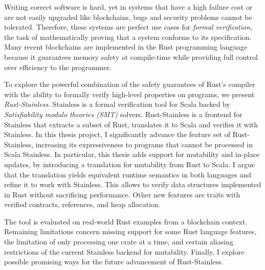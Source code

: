 Writing correct software is hard, yet in systems that have a high failure cost
or are not easily upgraded like blockchains, bugs and security problems cannot
be tolerated. Therefore, these systems are perfect use cases for \emph{formal
verification}, the task of mathematically proving that a system conforms to its
specification. Many recent blockchains are implemented in the Rust programming
language because it guarantees memory safety at compile-time while providing
full control over efficiency to the programmer.

To explore the powerful combination of the safety guarantees of Rust's compiler
with the ability to formally verify high-level properties on programs, we
present \emph{Rust-Stainless}. Stainless is a formal verification tool for Scala
backed by \emph{Satisfiability modulo theories (SMT)} solvers. Rust-Stainless is a frontend for Stainless that extracts
a subset of Rust, translates it to Scala and verifies it with Stainless. In this
thesis project, I significantly advance the feature set of Rust-Stainless,
increasing its expressiveness to programs that cannot be processed in Scala
Stainless. In particular, this thesis adds support for mutability and in-place
updates, by introducing a translation for mutability from Rust to Scala. I argue that the
translation yields equivalent runtime semantics in both languages and refine it
to work with Stainless. This allows to verify data structures implemented in
Rust without sacrificing performance. Other new features are traits with
verified contracts, references, and heap allocation.

The tool is evaluated on real-world Rust examples from a blockchain context.
Remaining limitations concern missing support for some Rust language features,
the limitation of only processing one crate at a time, and certain aliasing
restrictions of the current Stainless backend for mutability. Finally, I explore
possible promising ways for the future advancement of Rust-Stainless.
